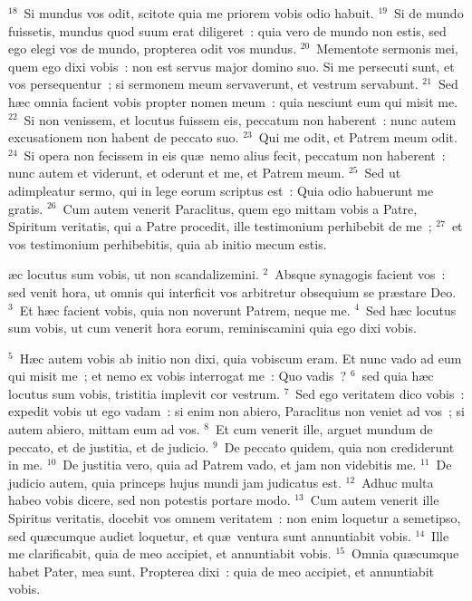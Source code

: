 ${}^{18}$~Si mundus vos odit, scitote quia me priorem vobis odio habuit.
${}^{19}$~Si de mundo fuissetis, mundus quod suum erat diligeret~: quia vero de mundo non estis, sed ego elegi vos de mundo, propterea odit vos mundus.
${}^{20}$~Mementote sermonis mei, quem ego dixi vobis~: non est servus major domino suo. Si me persecuti sunt, et vos persequentur~; si sermonem meum servaverunt, et vestrum servabunt.
${}^{21}$~Sed h\ae c omnia facient vobis propter nomen meum~: quia nesciunt eum qui misit me.
${}^{22}$~Si non venissem, et locutus fuissem eis, peccatum non haberent~: nunc autem excusationem non habent de peccato suo.
${}^{23}$~Qui me odit, et Patrem meum odit.
${}^{24}$~Si opera non fecissem in eis qu\ae\ nemo alius fecit, peccatum non haberent~: nunc autem et viderunt, et oderunt et me, et Patrem meum.
${}^{25}$~Sed ut adimpleatur sermo, qui in lege eorum scriptus est~: Quia odio habuerunt me gratis.
${}^{26}$~Cum autem venerit Paraclitus, quem ego mittam vobis a Patre, Spiritum veritatis, qui a Patre procedit, ille testimonium perhibebit de me~;
${}^{27}$~et vos testimonium perhibebitis, quia ab initio mecum estis.

\bchapter
{}\ae c locutus sum vobis, ut non scandalizemini.
${}^{2}$~Absque synagogis facient vos~: sed venit hora, ut omnis qui interficit vos arbitretur obsequium se pr\ae stare Deo.
${}^{3}$~Et h\ae c facient vobis, quia non noverunt Patrem, neque me.
${}^{4}$~Sed h\ae c locutus sum vobis, ut cum venerit hora eorum, reminiscamini quia ego dixi vobis.


${}^{5}$~H\ae c autem vobis ab initio non dixi, quia vobiscum eram. Et nunc vado ad eum qui misit me~; et nemo ex vobis interrogat me~: Quo vadis~?
${}^{6}$~sed quia h\ae c locutus sum vobis, tristitia implevit cor vestrum.
${}^{7}$~Sed ego veritatem dico vobis~: expedit vobis ut ego vadam~: si enim non abiero, Paraclitus non veniet ad vos~; si autem abiero, mittam eum ad vos.
${}^{8}$~Et cum venerit ille, arguet mundum de peccato, et de justitia, et de judicio.
${}^{9}$~De peccato quidem, quia non crediderunt in me.
${}^{10}$~De justitia vero, quia ad Patrem vado, et jam non videbitis me.
${}^{11}$~De judicio autem, quia princeps hujus mundi jam judicatus est.
${}^{12}$~Adhuc multa habeo vobis dicere, sed non potestis portare modo.
${}^{13}$~Cum autem venerit ille Spiritus veritatis, docebit vos omnem veritatem~: non enim loquetur a semetipso, sed qu\ae cumque audiet loquetur, et qu\ae\ ventura sunt annuntiabit vobis.
${}^{14}$~Ille me clarificabit, quia de meo accipiet, et annuntiabit vobis.
${}^{15}$~Omnia qu\ae cumque habet Pater, mea sunt. Propterea dixi~: quia de meo accipiet, et annuntiabit vobis.


